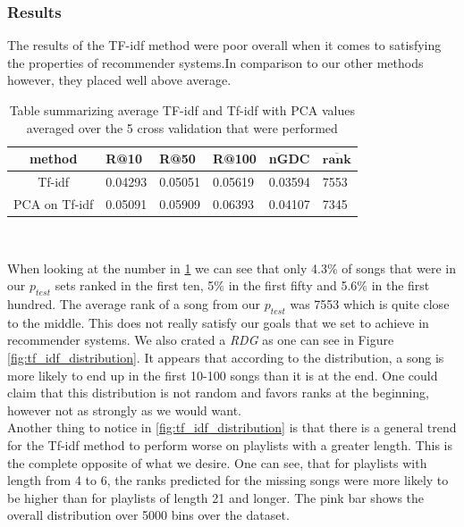 \subsubsection{Results}

The results of the TF-idf method were poor overall when it comes to satisfying the properties of recommender systems.In comparison to our other methods however, they placed well above average. \\

\begin{table}[h!]
\centering
\renewcommand{\arraystretch}{1.5}
\begin{tabu} to 1\textwidth {| c || X[c] | X[c] | X[c] | X[c] | X[c] | }
 \hline
 \textbf{method} & \textbf{R@10} & \textbf{R@50} & \textbf{R@100} & \textbf{nGDC} & $ \boldsymbol{\overline{rank}} $ \\
 \hline
 \hline
 Tf-idf & 0.04293 & 0.05051 & 0.05619 & 0.03594 & 7553 \\
 \hline
 PCA on Tf-idf & 0.05091 & 0.05909 & 0.06393 & 0.04107 & 7345 \\
 \hline
\end{tabu} \\
\caption{Table summarizing average TF-idf and Tf-idf with PCA values averaged over the 5 cross validation that were performed}
\label{table:1}
\end{table}

When looking at the number in \ref{table:1} we can see that only 4.3\% of songs that were in our $p_{test}$ sets ranked in the first ten, 5\% in the first fifty and 5.6\% in the first hundred. The average rank of a song from our $p_{test}$ was 7553 which is quite close to the middle. This does not really satisfy our goals that we set to achieve in recommender systems. We also crated a \textit{RDG} as one can see in Figure \ref{fig:tf_idf_distribution}. It appears that according to the distribution, a song is more likely to end up in the first 10-100 songs than it is at the end. One could claim that this distribution is not random and favors ranks at the beginning, however not as strongly as we would want.\\
Another thing to notice in \ref{fig:tf_idf_distribution} is that there is a general trend for the Tf-idf method to perform worse on playlists with a greater length. This is the complete opposite of what we desire. One can see, that for playlists with length from 4 to 6, the ranks predicted for the missing songs were more likely to be higher than for playlists of length 21 and longer. The pink bar shows the overall distribution over 5000 bins over the dataset. 

